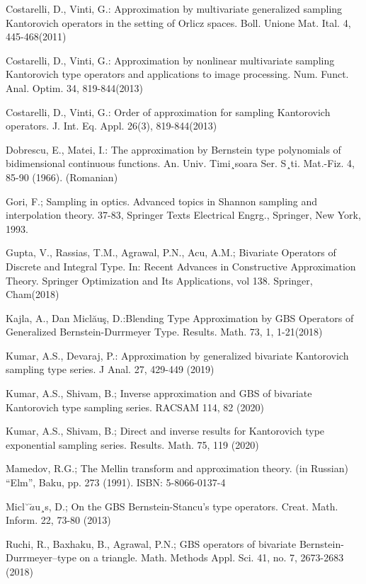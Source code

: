 \documentclass[12pt]{article}
\begin{document}
{\begin{thebibliography}{99}
 Costarelli, D., Vinti, G.: Approximation by multivariate generalized sampling Kantorovich operators in the setting of Orlicz spaces. Boll. Unione Mat. Ital. 4, 445-468(2011)

 Costarelli, D., Vinti, G.: Approximation by nonlinear multivariate sampling Kantorovich type operators and applications to image processing. Num. Funct. Anal. Optim. 34, 819-844(2013)

  Costarelli, D., Vinti, G.: Order of approximation for sampling Kantorovich operators. J. Int. Eq. Appl. 26(3), 819-844(2013)

 Dobrescu, E., Matei, I.: The approximation by Bernstein type polynomials of bidimensional continuous functions. An. Univ. Timi¸soara Ser. S¸ti. Mat.-Fiz. 4,
85-90 (1966). (Romanian)

 Gori, F.; Sampling in optics. Advanced topics in Shannon sampling and interpolation theory. 37-83, Springer Texts Electrical Engrg., Springer, New York, 1993.

 Gupta, V., Rassias, T.M., Agrawal, P.N., Acu, A.M.; Bivariate Operators of Discrete and Integral Type. In: Recent Advances in Constructive Approximation Theory. Springer Optimization and Its Applications, vol 138. Springer, Cham(2018)

 Kajla, A., Dan Micl\u{a}u\c{s}, D.:Blending Type Approximation by GBS Operators of Generalized Bernstein-Durrmeyer Type. Results. Math. 73, 1, 1-21(2018)

 Kumar, A.S., Devaraj, P.: Approximation by generalized bivariate Kantorovich sampling type series. J Anal. 27, 429-449 (2019)

 Kumar, A.S., Shivam, B.; Inverse approximation and GBS of bivariate Kantorovich type sampling series. RACSAM 114, 82 (2020)

 Kumar, A.S., Shivam, B.; Direct and inverse results for Kantorovich type exponential sampling series. Results. Math. 75, 119 (2020)

 Mamedov, R.G.; The Mellin transform and approximation theory. (in Russian) “Elm”, Baku, pp. 273 (1991). ISBN: 5-8066-0137-4

 Micl$˘\breve{a}$u¸s, D.; On the GBS Bernstein-Stancu's type operators. Creat. Math. Inform. 22, 73-80 (2013)

Ruchi, R., Baxhaku, B., Agrawal, P.N.; GBS operators of bivariate Bernstein-Durrmeyer–type on a triangle. Math. Methods Appl. Sci. 41, no. 7, 2673-2683 (2018)


\end{thebibliography}}
\end{document}
